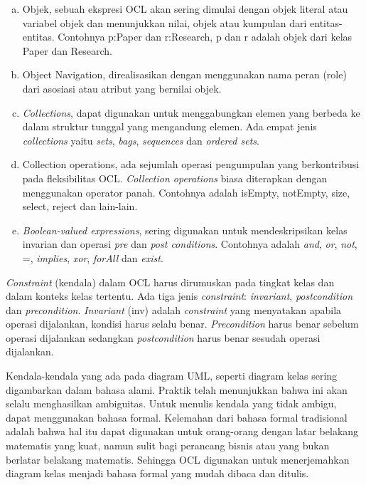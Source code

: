 \begin{enumerate}[a.]
	\item Objek, sebuah ekspresi OCL akan sering dimulai dengan objek literal atau variabel objek dan menunjukkan nilai, objek atau kumpulan dari entitas-entitas. Contohnya p:Paper dan r:Research, p dan r adalah objek dari kelas Paper dan Research.
	\item Object Navigation, direalisasikan dengan menggunakan nama peran (role) dari asosiasi atau atribut yang bernilai objek.
	\item \textit{Collections}, dapat digunakan untuk menggabungkan elemen yang berbeda ke dalam struktur tunggal yang mengandung elemen. Ada empat jenis \textit{collections} yaitu \textit{sets}, \textit{bags}, \textit{sequences }dan \textit{ordered sets}.
	\item Collection operations, ada sejumlah operasi pengumpulan yang berkontribusi pada fleksibilitas OCL. \textit{Collection operations }biasa diterapkan dengan menggunakan operator panah. Contohnya adalah isEmpty, notEmpty, size, select, reject dan lain-lain.
	\item \textit{Boolean-valued expressions}, sering digunakan untuk mendeskripsikan kelas invarian dan operasi \textit{pre} dan \textit{post conditions}. Contohnya adalah \textit{and}, \textit{or}, \textit{not}, =, \textit{implies}, \textit{xor}, \textit{forAll }dan \textit{exist}. 	
\end{enumerate}

\textit{Constraint} (kendala) dalam OCL harus dirumuskan pada tingkat kelas dan dalam konteks kelas tertentu. Ada tiga jenis \textit{constraint}: \textit{invariant}, \textit{postcondition} dan \textit{precondition}. \textit{Invariant} (inv) adalah \textit{constraint} yang menyatakan apabila operasi dijalankan, kondisi harus selalu benar. \textit{Precondition} harus benar sebelum operasi dijalankan sedangkan \textit{postcondition} harus benar sesudah operasi dijalankan. 

Kendala-kendala yang ada pada diagram UML, seperti diagram kelas sering digambarkan dalam bahasa alami. Praktik telah menunjukkan bahwa ini akan selalu menghasilkan ambiguitas. Untuk menulis kendala yang tidak ambigu, dapat menggunakan bahasa formal. Kelemahan dari bahasa formal tradisional adalah bahwa hal itu dapat digunakan untuk orang-orang dengan latar belakang matematis yang kuat, namun sulit bagi perancang bisnis atau yang bukan berlatar belakang matematis. Sehingga OCL digunakan untuk menerjemahkan  diagram kelas menjadi bahasa formal yang mudah dibaca dan ditulis.

